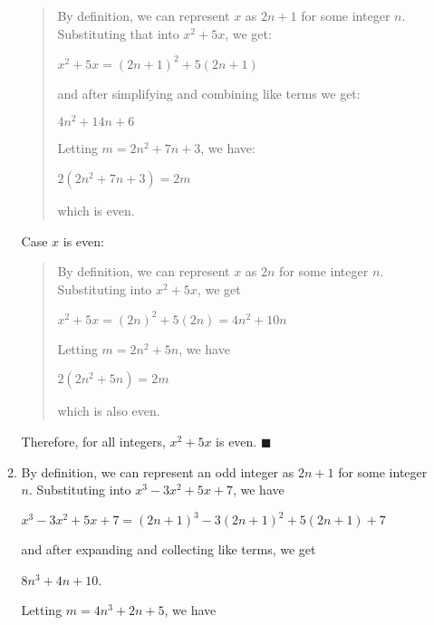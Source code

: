 \documentclass[12pt]{article}
\begin{document}
\begin{enumerate}
\begin{enumerate}
                    \begin{quote}
                        By definition, we can represent $x$ as $2n + 1$ for some integer $n$.
                        Substituting that into $x^2+5x$, we get:
                        \begin{center}$x^2+5x = (2n+1)^2 + 5(2n+1)$ \end{center}
                        and after simplifying and combining like terms we get:
                        \begin{center}$4n^2 + 14n + 6$ \end{center}
                        Letting $m = 2n^2 + 7n + 3$, we have:
                        \begin{center}$2(2n^2+7n+3) = 2m$\end{center}
                        which is even.
                    \end{quote}
                    Case $x$ is even:
                    \begin{quote}
                        By definition, we can represent $x$ as $2n$ for some integer $n$.
                        Substituting into $x^2 + 5x$, we get
                        \begin{center}
                            $x^2+5x = (2n)^2 + 5(2n) = 4n^2 + 10n$
                        \end{center}
                        Letting $m = 2n^2 + 5n$, we have
                        \begin{center}
                            $2(2n^2+5n) = 2m$
                        \end{center}
                        which is also even.
                    \end{quote}
                    Therefore, for all integers, $x^2+5x$ is even. \hfill $\blacksquare$
              \item By definition, we can represent an odd integer as $2n+1$ for some integer $n$.
                    Substituting into $x^3-3x^2+5x+7$, we have
                    \begin{center}
                        $x^3-3x^2+5x+7 = (2n+1)^3-3(2n+1)^2+5(2n+1)+7$
                    \end{center}
                    and after expanding and collecting like terms, we get
                    \begin{center}
                        $8n^3 + 4n + 10$.
                    \end{center}
                    Letting $m = 4n^3 + 2n + 5$, we have

\end{enumerate}
\end{enumerate}
\end{document}
